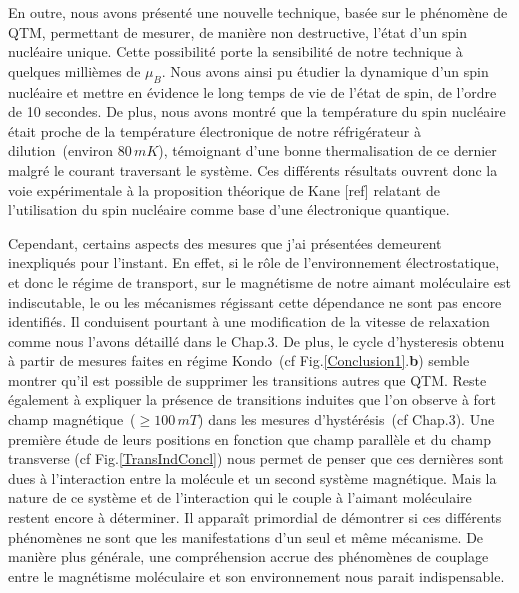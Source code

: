 En outre, nous avons présenté une nouvelle technique, basée sur le phénomène de QTM, permettant de mesurer, de manière non destructive, l'état d'un spin nucléaire unique. Cette possibilité porte la sensibilité de notre technique à quelques millièmes de $\mu_B$. Nous avons ainsi pu étudier la dynamique d'un spin nucléaire et mettre en évidence le long temps de vie de l'état de spin, de l'ordre de 10 secondes. De plus, nous avons montré que la température du spin nucléaire était proche de la température électronique de notre réfrigérateur à dilution~(environ 80$\,mK$), témoignant d'une bonne thermalisation de ce dernier malgré le courant traversant le système. Ces différents résultats ouvrent donc la voie expérimentale à la proposition théorique de Kane [ref] relatant de l'utilisation du spin nucléaire comme base d'une électronique quantique.


Cependant, certains aspects des mesures que j'ai présentées demeurent inexpliqués pour l'instant. En effet, si le rôle de l’environnement électrostatique, et donc le régime de transport, sur le magnétisme de notre aimant moléculaire est indiscutable, le ou les mécanismes régissant cette dépendance ne sont pas encore identifiés. Il conduisent pourtant à une modification de la vitesse de relaxation comme nous l'avons détaillé dans le Chap.3. De plus, le cycle d'hysteresis obtenu à partir de mesures faites en régime Kondo~(cf Fig.\ref{Conclusion1}.\textbf{b}) semble montrer qu'il est possible de supprimer les transitions autres que QTM.  Reste également à expliquer la présence de transitions induites que l'on observe à fort champ magnétique~($\geq 100\,mT$) dans les mesures d’hystérésis~(cf Chap.3). Une première étude de leurs positions en fonction que champ parallèle et du champ transverse (cf Fig.\ref{TransIndConcl}) nous permet de penser que ces dernières sont dues à l'interaction entre la molécule et un second système magnétique. Mais la nature de ce système et de l'interaction qui le couple à l'aimant moléculaire restent encore à déterminer. Il apparaît primordial de démontrer si ces différents phénomènes ne sont que les manifestations d'un seul et même mécanisme. De manière plus générale, une compréhension accrue des phénomènes de couplage entre le magnétisme moléculaire et son environnement nous parait indispensable.

